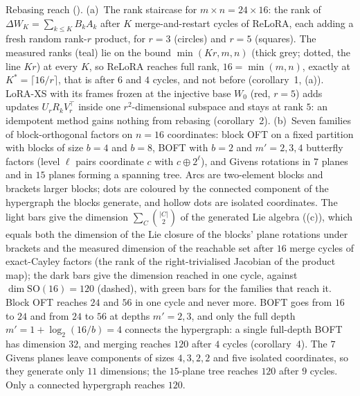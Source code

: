 Rebasing reach (). (a)~The rank staircase for $m\times n=24\times16$: the rank of $\Delta W_K=\sum_{k\le K}B_kA_k$ after $K$ merge-and-restart cycles of ReLoRA, each adding a fresh random rank-$r$ product, for $r=3$ (circles) and $r=5$ (squares). The measured ranks (teal) lie on the bound $\min(Kr,m,n)$ (thick grey; dotted, the line $Kr$) at every $K$, so ReLoRA reaches full rank, $16=\min(m,n)$, exactly at $K^*=\lceil16/r\rceil$, that is after $6$ and $4$ cycles, and not before (corollary~1, (a)). LoRA-XS with its frames frozen at the injective base $W_0$ (red, $r=5$) adds updates $U_rR_kV_r^\top$ inside one $r^2$-dimensional subspace and stays at rank $5$: an idempotent method gains nothing from rebasing (corollary~2). (b)~Seven families of block-orthogonal factors on $n=16$ coordinates: block OFT on a fixed partition with blocks of size $b=4$ and $b=8$, BOFT with $b=2$ and $m'=2,3,4$ butterfly factors (level $\ell$ pairs coordinate $c$ with $c\oplus2^\ell$), and Givens rotations in $7$ planes and in $15$ planes forming a spanning tree. Arcs are two-element blocks and brackets larger blocks; dots are coloured by the connected component of the hypergraph the blocks generate, and hollow dots are isolated coordinates. The light bars give the dimension $\sum_C\binom{\lvert C\rvert}{2}$ of the generated Lie algebra ((c)), which equals both the dimension of the Lie closure of the blocks' plane rotations under brackets and the measured dimension of the reachable set after $16$ merge cycles of exact-Cayley factors (the rank of the right-trivialised Jacobian of the product map); the dark bars give the dimension reached in one cycle, against $\dim\mathrm{SO}(16)=120$ (dashed), with green bars for the families that reach it. Block OFT reaches $24$ and $56$ in one cycle and never more. BOFT goes from $16$ to $24$ and from $24$ to $56$ at depths $m'=2,3$, and only the full depth $m'=1+\log_2(16/b)=4$ connects the hypergraph: a single full-depth BOFT has dimension $32$, and merging reaches $120$ after $4$ cycles (corollary~4). The $7$ Givens planes leave components of sizes $4,3,2,2$ and five isolated coordinates, so they generate only $11$ dimensions; the $15$-plane tree reaches $120$ after $9$ cycles. Only a connected hypergraph reaches $120$.
